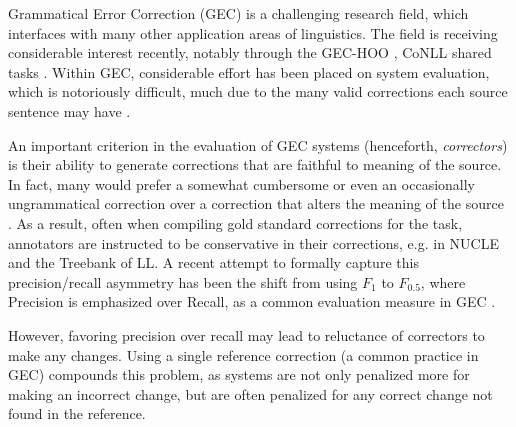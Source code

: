\documentclass[11pt]{article}
\begin{document}


Grammatical Error Correction (GEC) is a challenging research field, which interfaces with many other application areas of linguistics. The field is receiving considerable
interest recently, notably through the GEC-HOO \cite{dale2011helping,dale2012hoo},
CoNLL shared tasks \cite{kao2013conll,ng2014conll}.
Within GEC, considerable effort has been placed on system evaluation,
which is notoriously difficult,
much due to the many valid corrections each source sentence may have \cite{tetreault2008native,madnani2011they,chodorow2012problems,dahlmeier2012better}.

An important criterion in the evaluation of GEC systems (henceforth, {\it correctors})
is their ability to generate corrections that are faithful to meaning of the source. In fact, many would prefer
a somewhat cumbersome or even an occasionally ungrammatical correction over a correction
that alters the meaning of the source \cite{brockett2006correcting}.
As a result, often when compiling gold standard corrections for the task,
annotators are instructed to be conservative in their corrections, e.g. in NUCLE \cite{dahlmeier2013building} and the Treebank of LL\cite{yannakoudakis2011new}.
A recent attempt to formally capture this precision/recall asymmetry has
been the shift from using $F_1$ to $F_{0.5}$, where Precision is
emphasized over Recall, as a common evaluation measure
in GEC \cite{dahlmeier2012better}.

However, favoring precision over recall may lead to reluctance of correctors to make any changes.
Using a single reference correction (a common practice in GEC) compounds this problem,
as systems are not only penalized more for making an incorrect change, but are often penalized for any correct change not found in the reference.
\end{document}
